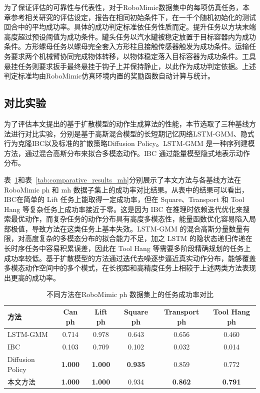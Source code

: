 为了保证评估的可靠性与代表性，对于RoboMimic数据集中的每项仿真任务，本章参考相关研究的评估设定，报告在相同初始条件下，在一千个随机初始化的测试回合中的平均成功率。具体的成功判定标准依任务性质而定。提升任务以方块末端高度超过预设阈值为成功条件。罐头任务以汽水罐被稳定放置于目标容器内为成功条件。方形螺母任务以螺母完全套入方形柱且接触传感器触发为成功条件。运输任务要求两个机械臂协同完成物体转移，以物体稳定落入目标容器为成功条件。工具悬挂任务则要求扳手最终悬挂于钩子上并保持静止，以此作为成功判定依据。上述判定标准均由RoboMimic仿真环境内置的奖励函数自动计算与统计。

\subsection{对比实验}
\label{subsec:comparative_experiments}

为了评估本文提出的基于扩散模型的动作生成算法的性能，本节选取了三种基线方法进行对比实验，分别是基于高斯混合模型的长短期记忆网络LSTM-GMM\cite{mandlekar2022matters}、隐式行为克隆IBC\cite{florence2022implicit}以及标准的扩散策略Diffusion Policy\cite{chi2023diffusion}。LSTM-GMM 是一种序列建模方法，通过混合高斯分布来拟合多模态动作。IBC 通过能量模型隐式地表示动作分布。

表~\ref{tab:comparative_results_ph}和表~\ref{tab:comparative_results_mh}分别展示了本文方法与各基线方法在RoboMimic ph 和 mh 数据子集上的成功率对比结果。从表中的结果可以看出，IBC在简单的 Lift 任务上能取得一定成功率，但在 Square、Transport 和 Tool Hang 等复杂任务上成功率接近于零。这是因为 IBC 在推理时依赖迭代优化来搜索最优动作，而复杂任务的动作分布具有高度多模态性，能量函数优化容易陷入局部极值，导致方法在这类任务上基本失效。LSTM-GMM 的混合高斯分量数量有限，对高度复杂的多模态分布的拟合能力不足，加之 LSTM 的隐状态递归传递在长时序任务中容易积累误差，因此在 Tool Hang 等需要多阶段精确规划的任务上成功率较低。基于扩散模型的方法通过迭代去噪逐步逼近真实动作分布，能够覆盖多模态动作空间中的多个模式，在长视距和高精度任务上相较于上述两类方法表现出更高的成功率。

\begin{table}[H]
  \centering
  \caption{不同方法在RoboMimic ph 数据集上的任务成功率对比}
  \label{tab:comparative_results_ph}
  \begin{tabular}{lccccc}
    \toprule
    方法 & Can ph & Lift ph & Square ph & Transport ph & Tool Hang ph \\
    \midrule
    LSTM-GMM\cite{mandlekar2022matters} & 0.714 & 0.978 & 0.643 & 0.656 & 0.460 \\
    IBC\cite{florence2022implicit} & 0.103 & 0.709 & 0.102 & 0.032 & 0.014 \\
    Diffusion Policy\cite{chi2023diffusion} & \textbf{1.000} & \textbf{1.000} & \textbf{0.935} & 0.859 & 0.772 \\
    \midrule     
    本文方法 & \textbf{1.000} & \textbf{1.000} & 0.934 & \textbf{0.862} & \textbf{0.791} \\
    \bottomrule
  \end{tabular}
\end{table}

